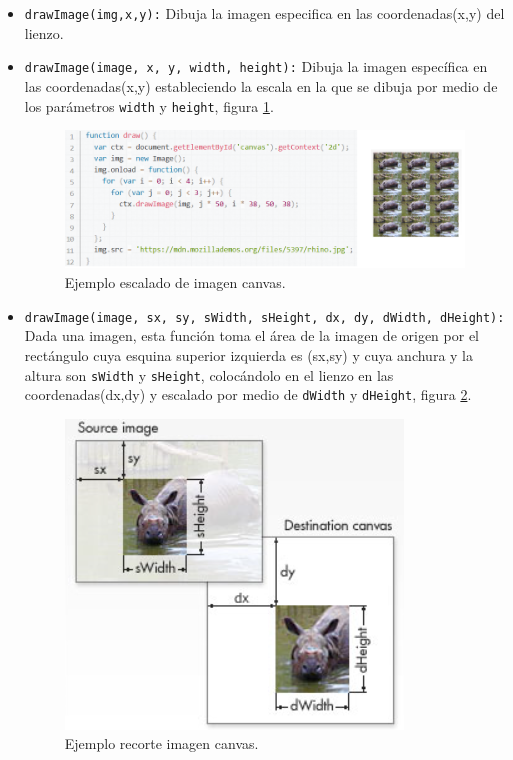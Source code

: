 \begin{itemize}
\item \texttt{drawImage(img,x,y):} Dibuja la imagen especifica en las coordenadas(x,y) del lienzo.
\item \texttt{drawImage(image, x, y, width, height):} Dibuja la imagen específica en las coordenadas(x,y) estableciendo la escala en la que se dibuja por medio de los parámetros \texttt{width} y \texttt{height}, figura \ref{fig:ImagenScale_Canvas}.
\begin{figure}[!h]
\begin{center}
   \includegraphics[width=0.8\linewidth]{Figures/ImagenScale_Canvas}
  \decoRule
  \caption[Ejemplo escalado de imagen canvas.]{Ejemplo escalado de imagen canvas.}
\label{fig:ImagenScale_Canvas}
\end{center}
\end{figure}
\item \texttt{drawImage(image, sx, sy, sWidth, sHeight, dx, dy, dWidth, dHeight):} Dada una imagen, esta función toma el área de la imagen de origen por el rectángulo cuya esquina superior izquierda es (sx,sy) y cuya anchura y la altura son \texttt{sWidth} y \texttt{sHeight}, colocándolo en el lienzo en las coordenadas(dx,dy) y escalado por medio de \texttt{dWidth} y \texttt{dHeight}, figura \ref{fig:ImagenRecorte_Canvas}.
\begin{figure}[!h]
\begin{center}
   \includegraphics[width=0.3\linewidth]{Figures/ImagenRecorte_Canvas}
  \decoRule
  \caption[Ejemplo recorte imagen canvas.]{Ejemplo recorte imagen canvas.}
   \label{fig:ImagenRecorte_Canvas}
\end{center}
\end{figure}
\end{itemize}
